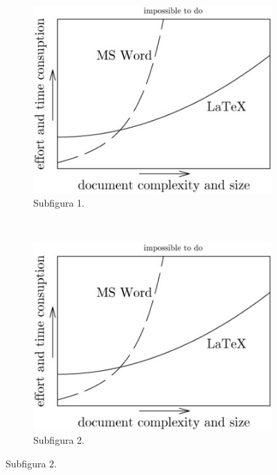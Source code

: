 \begin{figure}[!htbp]
    \centering
    \begin{subfigure}[b]{0.45\textwidth}
            \includegraphics[width=\textwidth]{capitulo-ej/graphics/ejemplo-1.jpg}
            \caption{Subfigura 1.}
    \end{subfigure}
    ~~~~
    \begin{subfigure}[b]{0.45\textwidth}
            \includegraphics[width=\textwidth]{capitulo-ej/graphics/ejemplo-1.jpg}
            \caption{Subfigura 2.}


\end{subfigure}
\end{figure}
